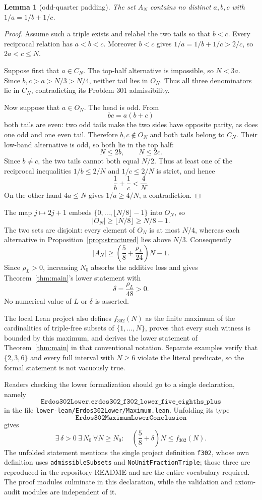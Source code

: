 \documentclass[11pt]{article}
\newtheorem{lemma}[theorem]{Lemma}
\theoremstyle{definition}
\theoremstyle{plain}
\begin{document}
\begin{lemma}[odd-quarter padding]\label{lem:padding}
The set $A_N$ contains no distinct $a,b,c$ with
$1/a=1/b+1/c$.
\end{lemma}
\begin{proof}
Assume such a triple exists and relabel the two tails so that $b<c$.
Every reciprocal relation has $a<b<c$.  Moreover $b<c$ gives
$1/a=1/b+1/c>2/c$, so $2a<c\leq N$.

Suppose first that $a\in C_N$.  The top-half alternative is impossible, so
$N<3a$.  Since $b,c>a>N/3>N/4$, neither tail lies in $O_N$.  Thus all three
denominators lie in $C_N$, contradicting its Problem 301 admissibility.

Now suppose that $a\in O_N$.  The head is odd.  From
\[
 bc=a(b+c)
\]
both tails are even: two odd tails make the two sides have opposite parity,
as does one odd and one even tail.  Therefore $b,c\notin O_N$ and both tails
belong to $C_N$.  Their low-band alternative is odd, so both lie in the top
half:
\[
 N\leq2b,\qquad N\leq2c.
\]
Since $b\ne c$, the two tails cannot both equal $N/2$.  Thus at least one of
the reciprocal inequalities $1/b\leq2/N$ and $1/c\leq2/N$ is strict, and
hence
\[
 \frac1b+\frac1c<\frac4N.
\]
On the other hand $4a\leq N$ gives $1/a\geq4/N$, a contradiction.
\end{proof}

The map $j\mapsto2j+1$ embeds $\{0,\ldots,\lfloor N/8\rfloor-1\}$ into
$O_N$, so
\[
 |O_N|\geq\lfloor N/8\rfloor\geq N/8-1.
\]
The two sets are disjoint: every element of $O_N$ is at most $N/4$, whereas
each alternative in Proposition~\ref{prop:structured} lies above $N/3$.
Consequently
\[
 |A_N|\geq
 \left(\frac58+\frac{\rho_L}{24}\right)N-1.
\]
Since $\rho_L>0$, increasing $N_0$ absorbs the additive loss and gives
Theorem~\ref{thm:main}'s lower statement with
\[
 \delta=\frac{\rho_L}{48}>0.
\]
No numerical value of $L$ or $\delta$ is asserted.

The local Lean project also defines $f_{302}(N)$ as the finite maximum of the
cardinalities of triple-free subsets of $\{1,\ldots,N\}$, proves that every
such witness is bounded by this maximum, and derives the lower statement of
Theorem~\ref{thm:main} in that conventional notation.  Separate examples
verify that $\{2,3,6\}$ and every full interval with $N\geq6$ violate the
literal predicate, so the formal statement is not vacuously true.

Readers checking the lower formalization should go to a single declaration,
namely
\[
 \texttt{Erdos302Lower.erdos302\_f302\_lower\_five\_eighths\_plus}
\]
in the file \texttt{lower-lean/Erdos302Lower/Maximum.lean}.  Unfolding its
type
\[
 \texttt{Erdos302MaximumLowerConclusion}
\]
gives
\[
 \exists\,\delta>0\ \exists\,N_0\ \forall N\geq N_0:\quad
 \left(\frac58+\delta\right)N\leq f_{302}(N).
\]
The unfolded statement mentions the single project definition \texttt{f302},
whose own definition uses \texttt{admissibleSubsets} and
\texttt{NoUnitFractionTriple}; those three are reproduced in the repository
README and are the entire vocabulary required.  The proof modules culminate
in this declaration, while the validation and axiom-audit modules are
independent of it.
\end{document}
